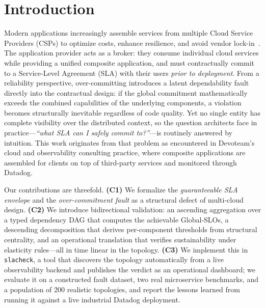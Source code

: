 \documentclass[conference]{IEEEtran}
\begin{document}
\section{Introduction}\label{sec:intro}

Modern applications increasingly assemble services from multiple Cloud Service Providers (CSPs) to optimize costs, enhance resilience, and avoid vendor lock-in~\cite{flexera2024}. The application provider acts as a broker: they consume individual cloud services while providing a unified composite application, and must contractually commit to a Service-Level Agreement (SLA) with their users \emph{prior to deployment}. From a reliability perspective, over-committing introduces a latent dependability fault~\cite{avizienis2004dependability} directly into the contractual design: if the global commitment mathematically exceeds the combined capabilities of the underlying components, a violation becomes structurally inevitable regardless of code quality. Yet no single entity has complete visibility over the distributed context, so the question architects face in practice---\textit{``what SLA can I safely commit to?''}---is routinely answered by intuition. This work originates from that problem as encountered in Devoteam's cloud and observability consulting practice, where composite applications are assembled for clients on top of third-party services and monitored through Datadog.

Our contributions are threefold. \textbf{(C1)} We formalize the \emph{guaranteeable SLA envelope} and the \emph{over-commitment fault} as a structural defect of multi-cloud design. \textbf{(C2)} We introduce bidirectional validation: an ascending aggregation over a typed dependency DAG that computes the achievable Global-SLOs, a descending decomposition that derives per-component thresholds from structural centrality, and an operational translation that verifies sustainability under elasticity rules---all in time linear in the topology. \textbf{(C3)} We implement this in \texttt{slacheck}, a tool that discovers the topology automatically from a live observability backend and publishes the verdict as an operational dashboard; we evaluate it on a constructed fault dataset, two real microservice benchmarks, and a population of 200 realistic topologies, and report the lessons learned from running it against a live industrial Datadog deployment.
\end{document}
